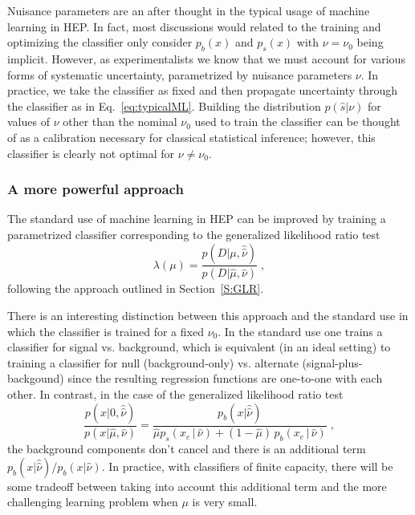 \documentclass[12pt]{article}
\numberwithin{equation}{section}
\theoremstyle{plain}
\begin{document}
Nuisance parameters are an after thought in the typical usage of machine
learning in HEP. In fact, most discussions would related to the training and
optimizing the classifier only consider $p_b(x)$ and $p_s(x)$ with $\nu=\nu_0$
being implicit. However, as experimentalists we know that we must account for
various forms of systematic uncertainty, parametrized by nuisance parameters
$\nu$. In practice, we take the classifier as fixed and then propagate
uncertainty through the classifier as in Eq.~\ref{eq:typicalML}. Building the
distribution $p(\hat s|\nu)$ for values of $\nu$ other than the nominal $\nu_0$
used to train the classifier can be thought of as a calibration necessary for
classical statistical inference; however, this classifier is clearly not optimal
for $\nu \ne \nu_0$.

\subsubsection{A more powerful  approach}

The standard use of machine learning in HEP can be improved by training a
parametrized classifier corresponding to the generalized likelihood ratio test
\begin{equation}
\lambda(\mu) = \frac{p(D|\mu, \hat{\hat{\nu}})}{p(D|\hat \mu, {\hat{\nu}})} \;,
\end{equation}
following the approach outlined in Section~\ref{S:GLR}.

There is an interesting distinction between this approach and the standard use
in which the classifier is trained for a fixed $\nu_0$. In the standard use one
trains a classifier for signal vs. background, which is equivalent (in an ideal
setting) to training a classifier for  null (background-only) vs. alternate
(signal-plus-backgound) since the resulting regression functions are one-to-one
with each other. In contrast, in the case of the generalized likelihood ratio
test
\begin{equation}\label{eq:hep_improved}
 \frac{p(x| 0, \hat{\hat{ \nu}})}{p(x|\hat \mu, \hat\nu)} =  \frac{p_b(x| \hat{\hat{ \nu}})}{ \hat \mu p_s( x_e \, |\,  \hat\nu)  + (1- \hat \mu )\, p_b( x_e \,|\, \hat \nu)} \; ,
\end{equation}
the background components don't cancel and there is an additional term $p_b(x|
\hat{\hat{ \nu}})/p_b(x| {\hat{ \nu}})$. In practice, with classifiers of finite
capacity, there will be some tradeoff between taking into account this
additional term and the more challenging learning problem when $\mu$ is very
small.
\end{document}
